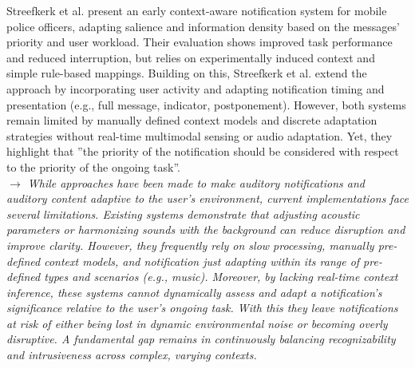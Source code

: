 Streefkerk et al. \cite{Streefker_07_PolicePatrolMessagePriorityBasedOnContext} present an early context-aware notification system for mobile police officers, adapting salience and information density based on the messages' priority and user workload. Their evaluation shows improved task performance and reduced interruption, but relies on experimentally induced context and simple rule-based mappings. Building on this, Streefkerk et al. \cite{Streefkerk_12_PolicePatrolAdaptiveNotifications} extend the approach by incorporating user activity and adapting notification timing and presentation (e.g., full message, indicator, postponement). However, both systems remain limited by manually defined context models and discrete adaptation strategies without real-time multimodal sensing or audio adaptation. Yet, they highlight that ''the priority of the notification should be considered with respect to the priority of the ongoing task''.  %
\\

\textit{$\rightarrow$ While approaches have been made to make auditory notifications and auditory content adaptive to the user's environment, current implementations face several limitations. Existing systems demonstrate that adjusting acoustic parameters or harmonizing sounds with the background can reduce disruption and improve clarity. However, they frequently rely on slow processing, manually pre-defined context models, and notification just adapting within its range of pre-defined types and scenarios (e.g., music). Moreover, by lacking real-time context inference, these systems cannot dynamically assess and adapt a notification's significance relative to the user's ongoing task. With this they leave notifications at risk of either being lost in dynamic environmental noise or becoming overly disruptive. A fundamental gap remains in continuously balancing recognizability and intrusiveness across complex, varying contexts.}

